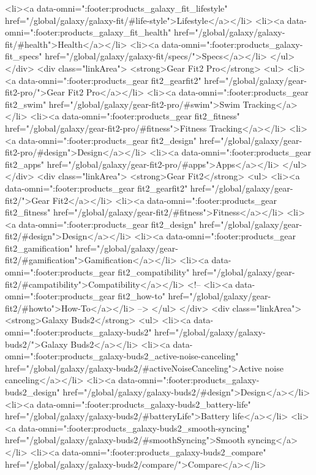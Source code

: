 {{{{{{{{{{{{{{{{{{{{{{{{{{{{{{{{{{{{{{{{{{{{{{{{{{{{{				<li><a data-omni=":footer:products_galaxy_fit_lifestyle" href="/global/galaxy/galaxy-fit/#life-style">Lifestyle</a></li>
				<li><a data-omni=":footer:products_galaxy_fit_health" href="/global/galaxy/galaxy-fit/#health">Health</a></li>
				<li><a data-omni=":footer:products_galaxy-fit_specs" href="/global/galaxy/galaxy-fit/specs/">Specs</a></li>
			</ul>
		</div>
		<div class="linkArea">
			<strong>Gear Fit2 Pro</strong>
			<ul>
				<li><a data-omni=":footer:products_gear fit2_gearfit2" href="/global/galaxy/gear-fit2-pro/">Gear Fit2 Pro</a></li>
				<li><a data-omni=":footer:products_gear fit2_swim" href="/global/galaxy/gear-fit2-pro/#swim">Swim Tracking</a></li>
				<li><a data-omni=":footer:products_gear fit2_fitness" href="/global/galaxy/gear-fit2-pro/#fitness">Fitness Tracking</a></li>
				<li><a data-omni=":footer:products_gear fit2_design" href="/global/galaxy/gear-fit2-pro/#design">Design</a></li>
				<li><a data-omni=":footer:products_gear fit2_apps" href="/global/galaxy/gear-fit2-pro/#apps">Apps</a></li>
			</ul>
		</div>
		<div class="linkArea">
			<strong>Gear Fit2</strong>
			<ul>
				<li><a data-omni=":footer:products_gear fit2_gearfit2" href="/global/galaxy/gear-fit2/">Gear Fit2</a></li>
				<li><a data-omni=":footer:products_gear fit2_fitness" href="/global/galaxy/gear-fit2/#fitness">Fitness</a></li>
				<li><a data-omni=":footer:products_gear fit2_design" href="/global/galaxy/gear-fit2/#design">Design</a></li>
				<li><a data-omni=":footer:products_gear fit2_gamification" href="/global/galaxy/gear-fit2/#gamification">Gamification</a></li>
				<li><a data-omni=":footer:products_gear fit2_compatibility" href="/global/galaxy/gear-fit2/#campatibility">Compatibility</a></li>
				<!-- <li><a data-omni=":footer:products_gear fit2_how-to" href="/global/galaxy/gear-fit2/#howto">How-To</a></li> -->
			</ul>
		</div>
		<div class="linkArea">
			<strong>Galaxy Buds2</strong>
			<ul>
				<li><a data-omni=":footer:products_galaxy-buds2" href="/global/galaxy/galaxy-buds2/">Galaxy Buds2</a></li>
				<li><a data-omni=":footer:products_galaxy-buds2_active-noise-canceling" href="/global/galaxy/galaxy-buds2/#activeNoiseCanceling">Active noise canceling</a></li>
				<li><a data-omni=":footer:products_galaxy-buds2_design" href="/global/galaxy/galaxy-buds2/#design">Design</a></li>
				<li><a data-omni=":footer:products_galaxy-buds2_battery-life" href="/global/galaxy/galaxy-buds2/#batteryLife">Battery life</a></li>
				<li><a data-omni=":footer:products_galaxy-buds2_smooth-syncing" href="/global/galaxy/galaxy-buds2/#smoothSyncing">Smooth syncing</a></li>
				<li><a data-omni=":footer:products_galaxy-buds2_compare" href="/global/galaxy/galaxy-buds2/compare/">Compare</a></li>
}}}}}}}}}}}}}}}}}}}}}}}}}}}}}}}}}}}}}}}}}}}}}}}}}}}}}
